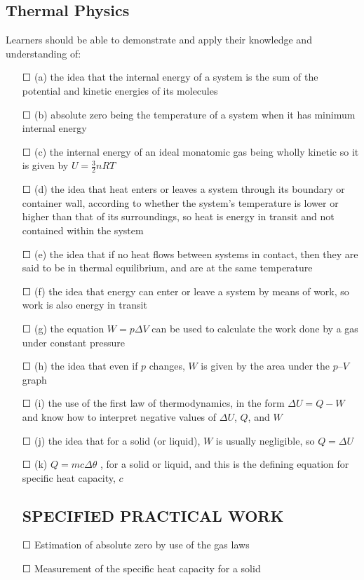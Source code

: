 \subsection{Thermal Physics}
Learners should be able to demonstrate and apply their knowledge and
understanding of:
\begin{itemize}
	\item[\Large{$\Square$}] (a) the idea that the internal energy of a system is the sum of the potential and kinetic energies of its molecules
	\item[\Large{$\Square$}] (b) absolute zero being the temperature of a system when it has minimum
	internal energy
	\item[\Large{$\Square$}]	(c) the internal energy of an ideal monatomic gas being wholly kinetic so it is given by \(U=\frac{3}{2}nRT\)
	\item[\Large{$\Square$}]	(d) the idea that heat enters or leaves a system through its boundary or container wall, according to whether the system's temperature is lower or higher than
	that of its surroundings, so heat is energy in transit and not contained within
	the system
	\item[\Large{$\Square$}]	(e) the idea that if no heat flows between systems in contact, then they are said to be in thermal equilibrium, and are at the same temperature
	\item[\Large{$\Square$}]	(f) the idea that energy can enter or leave a system by means of work, so work is also energy in transit
	\item[\Large{$\Square$}]	(g) the equation $W = p \Delta V $ can be used to calculate the work done by a gas under constant pressure
	\item[\Large{$\Square$}]	(h) the idea that even if $p$ changes, $W$ is given by the area under the $p – V$ graph
	\item[\Large{$\Square$}]	(i) the use of the first law of thermodynamics, in the form $\Delta U=Q-W $ and \sq know how to interpret negative values of $\Delta U $, $Q$, and $W$
	\item[\Large{$\Square$}]	(j) the idea that for a solid (or liquid), $W$ is usually negligible, so $Q = \Delta U$
	\item[\Large{$\Square$}]	(k) \(Q=mc\Delta \theta\) , for a solid or liquid, and this is the defining equation for specific	heat capacity, $ c $
	\subsection*{SPECIFIED PRACTICAL WORK}
	\item[\Large{$\Square$}] Estimation of absolute zero by use of the gas laws
	\item[\Large{$\Square$}] Measurement of the specific heat capacity for a solid
\end{itemize}
